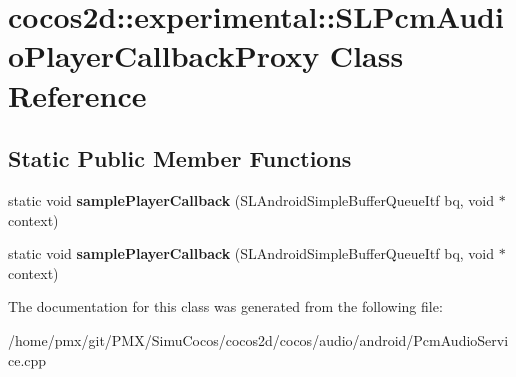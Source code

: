 \hypertarget{classcocos2d_1_1experimental_1_1SLPcmAudioPlayerCallbackProxy}{}\section{cocos2d\+:\+:experimental\+:\+:S\+L\+Pcm\+Audio\+Player\+Callback\+Proxy Class Reference}
\label{classcocos2d_1_1experimental_1_1SLPcmAudioPlayerCallbackProxy}
\subsection*{Static Public Member Functions}
\begin{DoxyCompactItemize}
\item 
\mbox{\label{classcocos2d_1_1experimental_1_1SLPcmAudioPlayerCallbackProxy_af8dc13874683cf82d5a1ec7ce319ed63}} 
static void {\bfseries sample\+Player\+Callback} (S\+L\+Android\+Simple\+Buffer\+Queue\+Itf bq, void $\ast$context)
\item 
\mbox{\label{classcocos2d_1_1experimental_1_1SLPcmAudioPlayerCallbackProxy_af8dc13874683cf82d5a1ec7ce319ed63}} 
static void {\bfseries sample\+Player\+Callback} (S\+L\+Android\+Simple\+Buffer\+Queue\+Itf bq, void $\ast$context)
\end{DoxyCompactItemize}


The documentation for this class was generated from the following file\+:\begin{DoxyCompactItemize}
\item 
/home/pmx/git/\+P\+M\+X/\+Simu\+Cocos/cocos2d/cocos/audio/android/Pcm\+Audio\+Service.\+cpp\end{DoxyCompactItemize}
